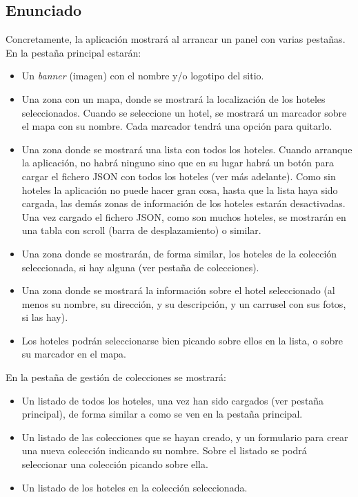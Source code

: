\subsection{Enunciado}

Concretamente, la aplicación mostrará al arrancar un panel con varias pestañas. En la pestaña principal estarán:

\begin{itemize}
  \item Un \emph{banner} (imagen) con el nombre y/o logotipo del sitio.
  \item Una zona con un mapa, donde se mostrará la localización de los hoteles seleccionados. Cuando se seleccione un hotel, se mostrará un marcador sobre el mapa con su nombre. Cada marcador tendrá una opción para quitarlo.
  \item Una zona donde se mostrará una lista con todos los hoteles. Cuando arranque la aplicación, no habrá ninguno sino que en su lugar habrá un botón para cargar el fichero JSON con todos los hoteles (ver más adelante). Como sin hoteles la aplicación no puede hacer gran cosa, hasta que la lista haya sido cargada, las demás zonas de información de los hoteles estarán desactivadas. Una vez cargado el fichero JSON, como son muchos hoteles, se mostrarán en una tabla con scroll (barra de desplazamiento) o similar.
  \item Una zona donde se mostrarán, de forma similar, los hoteles de la colección seleccionada, si hay alguna (ver pestaña de colecciones).
  \item Una zona donde se mostrará la información sobre el hotel seleccionado (al menos su nombre, su dirección, y su descripción, y un carrusel con sus fotos, si las hay).
  \item Los hoteles podrán seleccionarse bien picando sobre ellos en la lista, o sobre su marcador en el mapa.
\end{itemize}

En la pestaña de gestión de colecciones se mostrará:

\begin{itemize}
  \item Un listado de todos los hoteles, una vez han sido cargados (ver pestaña principal), de forma similar a como se ven en la pestaña principal.
  \item Un listado de las colecciones que se hayan creado, y un formulario para crear una nueva colección indicando su nombre. Sobre el listado se podrá seleccionar una colección picando sobre ella.
  \item Un listado de los hoteles en la colección seleccionada.
\end{itemize}


